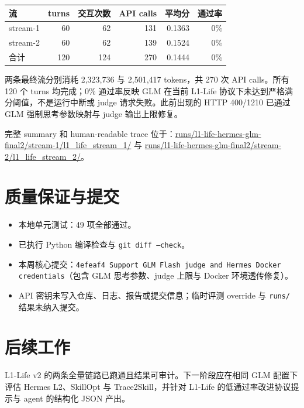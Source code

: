\documentclass[11pt,a4paper]{ctexart}
\begin{document}
\begin{center}
\renewcommand{\arraystretch}{1.15}
\begin{tabular}{lrrrrr}
\toprule
流 & turns & 交互次数 & API calls & 平均分 & 通过率 \\
\midrule
stream-1 & 60 & 62 & 131 & 0.1363 & 0\% \\
stream-2 & 60 & 62 & 139 & 0.1524 & 0\% \\
\midrule
合计 & 120 & 124 & 270 & 0.1444 & 0\% \\
\bottomrule
\end{tabular}
\end{center}

两条最终流分别消耗 2,323,736 与 2,501,417 tokens，共 270 次 API calls。所有 120 个 turns 均完成；0\% 通过率反映 GLM 在当前 L1-Life 协议下未达到严格满分阈值，不是运行中断或 judge 请求失败。此前出现的 HTTP 400/1210 已通过 GLM 强制思考参数映射与 judge 输出上限修复。

完整 summary 和 human-readable trace 位于：\url{runs/l1-life-hermes-glm-final2/stream-1/l1_life_stream_1/} 与 \url{runs/l1-life-hermes-glm-final2/stream-2/l1_life_stream_2/}。

\section{质量保证与提交}

\begin{itemize}
  \item 本地单元测试：49 项全部通过。
  \item 已执行 Python 编译检查与 \texttt{git diff --check}。
  \item 本周核心提交：\texttt{4efeaf4 Support GLM Flash judge and Hermes Docker credentials}（包含 GLM 思考参数、judge 上限与 Docker 环境透传修复）。
  \item API 密钥未写入仓库、日志、报告或提交信息；临时评测 override 与 \texttt{runs/} 结果未纳入提交。
\end{itemize}

\section{后续工作}

L1-Life v2 的两条全量链路已跑通且结果可审计。下一阶段应在相同 GLM 配置下评估 Hermes L2、SkillOpt 与 Trace2Skill，并针对 L1-Life 的低通过率改进协议提示与 agent 的结构化 JSON 产出。
\end{document}
